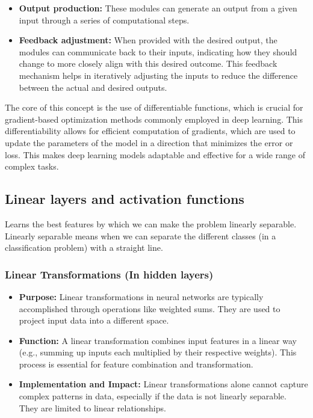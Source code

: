 \documentclass{article}
\begin{document}
\begin{itemize}
    \item \textbf{Output production:} These modules can generate an output from a given input through a series of computational steps.
    \item \textbf{Feedback adjustment:} When provided with the desired output, the modules can communicate back to their inputs, indicating how they should change to more closely align with this desired outcome. This feedback mechanism helps in iteratively adjusting the inputs to reduce the difference between the actual and desired outputs.
\end{itemize}

The core of this concept is the use of differentiable functions, which is crucial for gradient-based optimization methods commonly employed in deep learning. This differentiability allows for efficient computation of gradients, which are used to update the parameters of the model in a direction that minimizes the error or loss. This makes deep learning models adaptable and effective for a wide range of complex tasks.

\subsection{Linear layers and activation functions}
Learns the best features by which we can make the problem linearly 
separable. Linearly separable means when we can separate the different classes (in a classification
problem) with a straight line.

\subsubsection{Linear Transformations (In hidden layers)}
\begin{itemize}
    \item \textbf{Purpose:} Linear transformations in neural networks are typically accomplished through operations like weighted sums. They are used to project input data into a different space.
    \item \textbf{Function:} A linear transformation combines input features in a linear way (e.g., summing up inputs each multiplied by their respective weights). This process is essential for feature combination and transformation.
    \item \textbf{Implementation and Impact:} Linear transformations alone cannot capture complex patterns in data, especially if the data is not linearly separable. They are limited to linear relationships.
\end{itemize}
\end{document}
